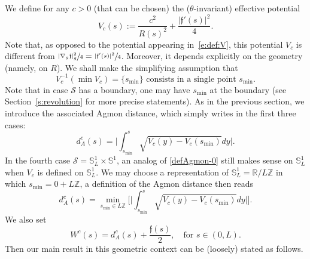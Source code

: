 \documentclass[JEP,XML,SOM,Unicode]{cedram}
\theoremstyle{definition}
\newcommand{\calS}{\ensuremath{\mathcal S}}
\newcommand{\mb}[1]{\ensuremath{\mathbb{#1}}}
\newcommand{\R}{{\mb{R}}}
\newcommand{\bS}{\ensuremath{\mathbb S}}
\newcommand{\Z}{\mathbb Z}
\newcommand{\f}{\ensuremath{\mathfrak{f}}}
\newcommand{\ce}{c}
\begin{document}
We define for any $\ce>0$ (that can be chosen) the ($\theta$-invariant) effective potential
\begin{equation}
\label{e:def-Vce}
V_\ce (s) := \frac{\ce^2}{R(s)^2} + \frac{| \f'(s)|^2}{4}.
\end{equation}
Note that, as opposed to the potential appearing in~\eqref{e:def:V}, this potential $V_\ce$ is different from $\sfrac{|\nabla_g\f|_g^2}{4} = \sfrac{| \f'(s)|^2}{4}$.
Moreover, it depends explicitly on the geometry (namely, on $R$).
We shall make the simplifying assumption that
\begin{equation}
\label{s:asspt-uniq-min}
V_{\ce}^{-1}(\min V_\ce) = \{s_{\min}\} \text{ consists in a single point }s_{\min}.
\end{equation}
Note that in case $\calS$ has a boundary, one may have $s_{\min}$ at the boundary (see Section~\ref{s:revolution} for more precise statements).
As in the previous section, we introduce the associated Agmon distance, which simply writes in the first three cases:
\begin{equation}
\label{e:defbisdA}
d_{A}^{\ce}(s) = \biggl| \int_{s_{\min}}^s \sqrt{ V_\ce(y)- V_\ce(s_{\min})} dy \biggr|.
\end{equation}
In the fourth case $\calS = \bS^1_L\times \bS^1$, an analog of \eqref{defAgmon-0} still makes sense on $\bS^1_L$ when $V_{\ce}$ is defined on $\bS^1_L$. We may choose a representation of $\bS^1_L=\R/L\Z$ in which $s_{\min}= 0 + L \Z$, a definition of the Agmon distance then reads
\begin{equation}
\label{e:defbisdAT2}
d_{A}^{\ce}(s) = \min_{s_{\min}\in L \Z}\biggl[ \biggl| \int_{s_{\min}}^s \sqrt{ V_\ce(y)- V_\ce(s_{\min})} dy \biggr|\biggr].
\end{equation}
We also set
\begin{equation}
\label{e:def-Wce}
W^{\ce}(s)=d_A^{\ce}(s)+\frac{\f(s)}{2},\quad \text{for } s \in (0,L).
\end{equation}
Then our main result in this geometric context can be (loosely) stated as follows.
\end{document}
